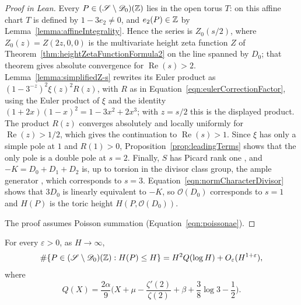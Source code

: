 \begin{proof}[Proof in Lean]

\leanok


Every $P\in(\mathscr{S}\setminus\mathscr{D}_0)(\mathbb{Z})$ lies in the open torus $T$: on this affine chart $T$ is defined by $1-3e_2\neq0$, and $e_2(P)\in\mathbb{Z}$ by Lemma~\ref{lemma:affineIntegrality}. Hence the series is $Z_0(s/2)$, where $Z_0(z)=Z(2z,0,0)$ is the multivariate height zeta function $Z$ of Theorem~\ref{thm:heightZetaFunctionFormula2} on the line spanned by $D_0$; that theorem gives absolute convergence for $\operatorname{Re}(s)>2$. Lemma~\ref{lemma:simplifiedZ-s} rewrites its Euler product as $(1-3^{-z})^2\xi(z)^2R(z)$, with $R$ as in Equation~\ref{eqn:eulerCorrectionFactor}, using the Euler product of $\xi$ and the identity $(1+2x)(1-x)^2=1-3x^2+2x^3$; with $z=s/2$ this is the displayed product. The product $R(z)$ converges absolutely and locally uniformly for $\operatorname{Re}(z)>1/2$, which gives the continuation to $\operatorname{Re}(s)>1$. Since $\xi$ has only a simple pole at $1$ and $R(1)>0$, Proposition~\ref{prop:leadingTerms} shows that the only pole is a double pole at $s=2$. Finally, $S$ has Picard rank one \cite[Corollary~3.6]{odesky2023moduli}, and $-K=D_0+D_1+D_2$ is, up to torsion in the divisor class group, the ample generator \cite[Theorems~3.5 and~3.7]{odesky2023moduli}, which corresponds to $s=3$. Equation~\ref{eqn:normCharacterDivisor} shows that $3D_0$ is linearly equivalent to $-K$, so $\mathcal O(D_0)$ corresponds to $s=1$ and $H(P)$ is the toric height $H(P,\mathcal O(D_0))$.

The proof assumes Poisson summation (Equation~\ref{eqn:poissonae}).

\end{proof}

\begin{corollary}

\label{cor:integralPointCount}


\leanok



 For every $\varepsilon>0$, as $H\to\infty$, \[ \#\{P\in(\mathscr{S}\setminus\mathscr{D}_0)(\mathbb{Z}):H(P)\leq H\} =H^2Q(\log H)+O_\varepsilon(H^{1+\varepsilon}), \] where \begin{equation*} Q(X)=\frac{2\alpha}{9} \biggl(X+\mu-\frac{\zeta'(2)}{\zeta(2)} +\beta+\frac38\log3-\frac12\biggr). \end{equation*} 

\end{corollary}

